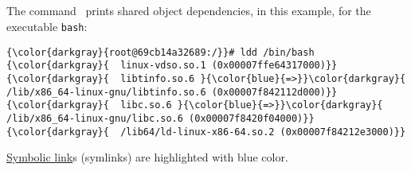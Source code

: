 % 

\subsection{\ldd}
\label{sec:ldd}
The command  \ prints shared object dependencies, in this example, for the executable \texttt{bash}:
{\footnotesize{
\begin{Verbatim}[commandchars=\\\{\}]
{\color{darkgray}{root@69cb14a32689:/}}# ldd /bin/bash
{\color{darkgray}{	linux-vdso.so.1 (0x00007ffe64317000)}}
{\color{darkgray}{	libtinfo.so.6 }{\color{blue}{=>}}\color{darkgray}{ /lib/x86_64-linux-gnu/libtinfo.so.6 (0x00007f842112d000)}}
{\color{darkgray}{	libc.so.6 }{\color{blue}{=>}}\color{darkgray}{ /lib/x86_64-linux-gnu/libc.so.6 (0x00007f8420f04000)}}
{\color{darkgray}{	/lib64/ld-linux-x86-64.so.2 (0x00007f84212e3000)}}
\end{Verbatim}
}}
\href{https://en.wikipedia.org/wiki/Symbolic_link}{Symbolic link}s (symlinks) are highlighted with blue color.

\endinput  %
